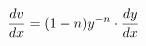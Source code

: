 \documentclass[preview]{standalone}
\begin{document}
\begin{align*}
\special{dvisvgm:raw <g id='unique000'>}\frac{dv}{dx} = (1 - n)y^{-n} \cdot \frac{dy}{dx}\special{dvisvgm:raw </g>}
\end{align*}
\end{document}
